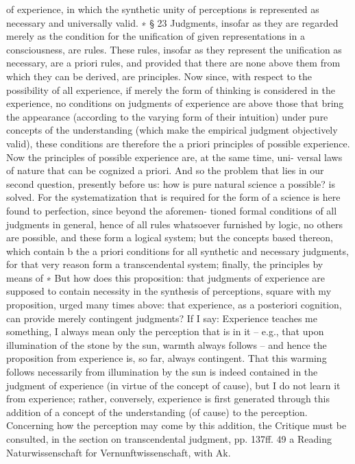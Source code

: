 of experience, in which the synthetic unity of perceptions is represented
as necessary and universally valid. ∗
§ 23
Judgments, insofar as they are regarded merely as the condition for the
uniﬁcation of given representations in a consciousness, are rules. These
rules, insofar as they represent the uniﬁcation as necessary, are a priori
rules, and provided that there are none above them from which they can
be derived, are principles. Now since, with respect to the possibility of all
experience, if merely the form of thinking is considered in the experience,
no conditions on judgments of experience are above those that bring
the appearance (according to the varying form of their intuition) under
pure concepts of the understanding (which make the empirical judgment
objectively valid), these conditions are therefore the a priori principles
of possible experience.
Now the principles of possible experience are, at the same time, uni-
versal laws of nature that can be cognized a priori. And so the problem
that lies in our second question, presently before us: how is pure natural
science a possible? is solved. For the systematization that is required for the
form of a science is here found to perfection, since beyond the aforemen-
tioned formal conditions of all judgments in general, hence of all rules
whatsoever furnished by logic, no others are possible, and these form
a logical system; but the concepts based thereon, which contain b the a
priori conditions for all synthetic and necessary judgments, for that very
reason form a transcendental system; ﬁnally, the principles by means of
∗ But how does this proposition: that judgments of experience are supposed to
contain necessity in the synthesis of perceptions, square with my proposition,
urged many times above: that experience, as a posteriori cognition, can provide
merely contingent judgments? If I say: Experience teaches me something, I
always mean only the perception that is in it – e.g., that upon illumination of
the stone by the sun, warmth always follows – and hence the proposition from
experience is, so far, always contingent. That this warming follows necessarily
from illumination by the sun is indeed contained in the judgment of experience
(in virtue of the concept of cause), but I do not learn it from experience; rather,
conversely, experience is ﬁrst generated through this addition of a concept of
the understanding (of cause) to the perception. Concerning how the perception
may come by this addition, the Critique must be consulted, in the section on
transcendental judgment, pp. 137ff. 49
a Reading Naturwissenschaft for Vernunftwissenschaft, with Ak.
